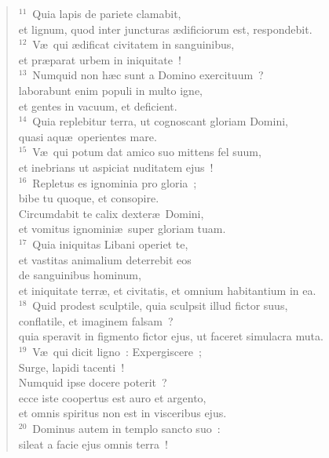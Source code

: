 \begin{flushleft}
\begin{verse}
${}^{11}$~Quia lapis de pariete clamabit,\\ et lignum, quod inter juncturas \ae dificiorum est, respondebit.\\
${}^{12}$~V\ae\ qui \ae dificat civitatem in sanguinibus,\\ et pr\ae parat urbem in iniquitate~!\\
${}^{13}$~Numquid non h\ae c sunt a Domino exercituum~?\\ laborabunt enim populi in multo igne,\\ et gentes in vacuum, et deficient.\\
${}^{14}$~Quia replebitur terra, ut cognoscant gloriam Domini,\\ quasi aqu\ae\ operientes mare.\\
${}^{15}$~V\ae\ qui potum dat amico suo mittens fel suum,\\ et inebrians ut aspiciat nuditatem ejus~!\\
${}^{16}$~Repletus es ignominia pro gloria~;\\ bibe tu quoque, et consopire.\\ Circumdabit te calix dexter\ae\ Domini,\\ et vomitus ignomini\ae\ super gloriam tuam.\\
${}^{17}$~Quia iniquitas Libani operiet te,\\ et vastitas animalium deterrebit eos\\ de sanguinibus hominum,\\ et iniquitate terr\ae , et civitatis, et omnium habitantium in ea.\\
${}^{18}$~Quid prodest sculptile, quia sculpsit illud fictor suus,\\ conflatile, et imaginem falsam~?\\ quia speravit in figmento fictor ejus, ut faceret simulacra muta.\\
${}^{19}$~V\ae\ qui dicit ligno~: Expergiscere~;\\ Surge, lapidi tacenti~!\\ Numquid ipse docere poterit~?\\ ecce iste coopertus est auro et argento,\\ et omnis spiritus non est in visceribus ejus.\\
${}^{20}$~Dominus autem in templo sancto suo~:\\ sileat a facie ejus omnis terra~!\end{verse}\end{flushleft}



